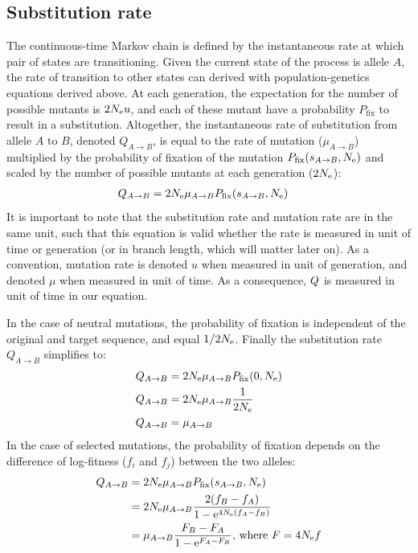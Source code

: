 \subsection{Substitution rate}
The continuous-time Markov chain is defined by the instantaneous rate at which pair of states are transitioning.
Given the current state of the process is allele $A$, the rate of transition to other states can derived with population-genetics equations derived above.
At each generation, the expectation for the number of possible mutants is $2N_{\textrm{e}} u$, and each of these mutant have a probability $P_{\mathrm{fix}}$ to result in a \gls{substitution}.
Altogether, the instantaneous rate of \gls{substitution} from \gls{allele} $A$ to $B$, denoted $Q_{A \to B}$, is equal to the rate of mutation ($\mu_{A \to B}$) multiplied by the probability of fixation of the mutation $P_{\mathrm{fix}}(s_{A \to B}, N_{\textrm{e}})$ and scaled by the number of possible mutants at each generation ($2N_{\textrm{e}}$):
\begin{align}
Q_{A \to B} & = 2 N_{\textrm{e}} \mu_{A \to B}  P_{\mathrm{fix}}(s_{A \to B}, N_{\textrm{e}})
\end{align}
It is important to note that the \gls{substitution} rate and mutation rate are in the same unit, such that this equation is valid whether the rate is measured in unit of time or generation (or in branch length, which will matter later on).
As a convention, mutation rate is denoted $u$ when measured in unit of generation, and denoted $\mu$ when measured in unit of time. As a consequence, $Q$ is measured in unit of time in our equation.

In the case of \gls{neutral} mutations, the probability of fixation is independent of the original and target sequence, and equal $1/2 N_{\textrm{e}}$. Finally the substitution rate $Q_{A \to B}$ simplifies to: 
\begin{align}
Q_{A \to B} & = 2 N_{\textrm{e}} \mu_{A \to B}  P_{\mathrm{fix}}(0, N_{\textrm{e}}) \\
Q_{A \to B} & = 2 N_{\textrm{e}} \mu_{A \to B} \dfrac{1}{2N_{\textrm{e}}} \\
Q_{A \to B} & =  \mu_{A \to B} \label{eq:sub-equal-mut}
\end{align}
In the case of selected mutations, the probability of fixation depends on the difference of log-fitness ($f_i$ and $f_j$) between the two alleles:
\begin{align}
Q_{A \to B} & = 2 N_{\textrm{e}} \mu_{A \to B} P_{\mathrm{fix}}(s_{A \to B}, N_{\textrm{e}}) \\
			& = 2 N_{\textrm{e}} \mu_{A \to B}  \dfrac{2(f_{B} - f_{A})}{1 - \mathrm{e}^{4N_{\textrm{e}}(f_{A} - f_{B})} } \\
			& = \mu_{A \to B} \dfrac{F_{B} - F_{A}}{1 - \mathrm{e}^{F_{A} - F_{B}} }\text{, where } F = 4N_{\textrm{e}} f \label{eq:sub-transion-rates}
\end{align}

